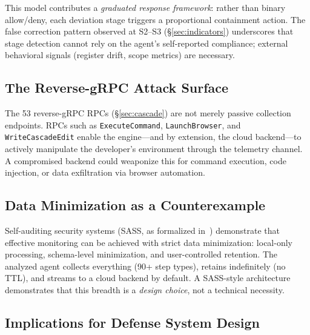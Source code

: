 \documentclass[sigconf,anonymous]{acmart}
\begin{document}
\noindent This model contributes a \emph{graduated response
framework}: rather than binary allow/deny, each deviation stage
triggers a proportional containment action.  The false correction
pattern observed at S2--S3 (\S\ref{sec:indicators}) underscores that
stage detection cannot rely on the agent's self-reported compliance;
external behavioral signals (register drift, scope metrics) are
necessary.

\subsection{The Reverse-gRPC Attack Surface}

The 53 reverse-gRPC RPCs (\S\ref{sec:cascade}) are not merely passive
collection endpoints.  RPCs such as \texttt{ExecuteCommand},
\texttt{LaunchBrowser}, and \texttt{WriteCascadeEdit} enable the
engine---and by extension, the cloud backend---to actively manipulate
the developer's environment through the telemetry channel.  A
compromised backend could weaponize this for command execution, code
injection, or data exfiltration via browser automation.

\subsection{Data Minimization as a Counterexample}

Self-auditing security systems (SASS, as formalized in~\cite{sass-draft}) demonstrate
that effective monitoring can be achieved with strict data
minimization: local-only processing, schema-level minimization, and
user-controlled retention.  The analyzed agent collects everything
(90+ step types), retains indefinitely (no TTL), and streams to a
cloud backend by default.  A SASS-style architecture demonstrates
that this breadth is a \emph{design choice}, not a technical
necessity.

\subsection{Implications for Defense System Design}
\end{document}
